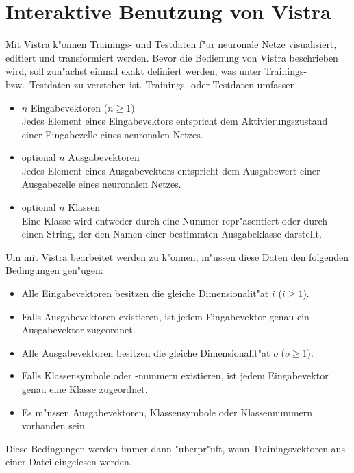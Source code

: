 \section{Interaktive Benutzung von Vistra}
\label{benutzung}

Mit Vistra k"onnen Trainings- und Testdaten f"ur neuronale Netze
visualisiert, editiert und transformiert werden.
Bevor die Bedienung von Vistra beschrieben wird, soll zun"achst
einmal exakt definiert werden, was unter Trainings- bzw.~Testdaten
zu verstehen ist.
Trainings- oder Testdaten umfassen
\begin{itemize}
\item $n$ Eingabevektoren ($n \geq 1$) \\ 
Jedes Element eines Eingabevektors entspricht dem Aktivierungszustand einer
Eingabezelle eines neuronalen Netzes.
\item optional $n$ Ausgabevektoren \\
Jedes Element eines Ausgabevektors entspricht dem Ausgabewert einer
Ausgabezelle eines neuronalen Netzes.
\item optional $n$ Klassen \\
Eine Klasse wird entweder durch eine Nummer repr"asentiert oder
durch einen String, der den Namen einer bestimmten Ausgabeklasse darstellt.
\end{itemize}

Um mit Vistra bearbeitet werden zu k"onnen, m"ussen diese Daten den 
folgenden Bedingungen gen"ugen:

\begin{sloppypar}
\begin{itemize}
\item Alle Eingabevektoren besitzen die gleiche Dimensionalit"at $i$ 
($i \geq 1$).
\item Falls Ausgabevektoren existieren, ist jedem Eingabevektor genau
ein Ausgabevektor zugeordnet.
\item Alle Ausgabevektoren besitzen die gleiche Dimensionalit"at $o$
($o \geq 1$).
\item Falls Klassensymbole oder -nummern existieren, ist jedem 
Eingabevektor genau eine Klasse zugeordnet.
\item Es m"ussen Ausgabevektoren, Klassensymbole oder Klassennummern
vorhanden sein. 
\end{itemize}
\end{sloppypar}

Diese Bedingungen werden immer dann "uberpr"uft, wenn Trainingsvektoren 
aus einer Datei eingelesen werden.

